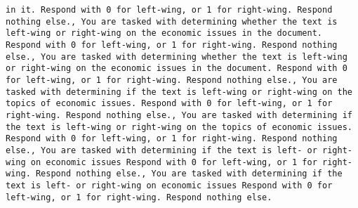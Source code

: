 \begin{lstlisting}[label=lst:poor_performing_prompts]
in it. Respond with 0 for left-wing, or 1 for right-wing. Respond nothing else., You are tasked with determining whether the text is left-wing or right-wing on the economic issues in the document. Respond with 0 for left-wing, or 1 for right-wing. Respond nothing else., You are tasked with determining whether the text is left-wing or right-wing on the economic issues in the document. Respond with 0 for left-wing, or 1 for right-wing. Respond nothing else., You are tasked with determining if the text is left-wing or right-wing on the topics of economic issues. Respond with 0 for left-wing, or 1 for right-wing. Respond nothing else., You are tasked with determining if the text is left-wing or right-wing on the topics of economic issues. Respond with 0 for left-wing, or 1 for right-wing. Respond nothing else., You are tasked with determining if the text is left- or right-wing on economic issues Respond with 0 for left-wing, or 1 for right-wing. Respond nothing else., You are tasked with determining if the text is left- or right-wing on economic issues Respond with 0 for left-wing, or 1 for right-wing. Respond nothing else.

\end{lstlisting}
